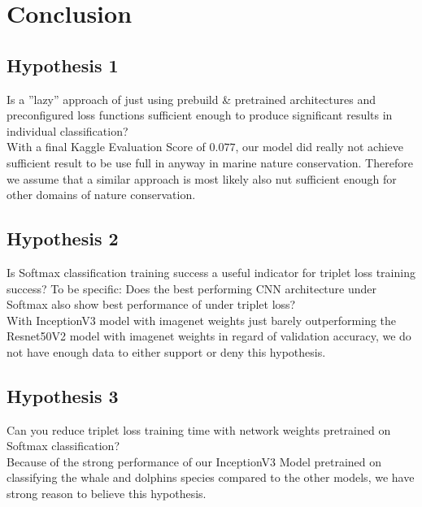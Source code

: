 \section{Conclusion}

\subsection{Hypothesis 1}
Is a ”lazy” approach of just using prebuild \& pretrained architectures and preconfigured loss functions sufficient enough to produce significant results in individual classification?
\\
With a final Kaggle Evaluation Score of $0.077$, our model did really not achieve sufficient result to be use full in anyway in marine nature conservation. Therefore we assume that a similar approach is most likely also nut sufficient enough for other domains of nature conservation.

\subsection{Hypothesis 2}
Is Softmax classification training success a useful indicator for triplet loss training success? To be specific: Does the best performing CNN architecture under Softmax also show best performance of under triplet loss?
\\
With InceptionV3 model with imagenet weights just barely outperforming the Resnet50V2 model with imagenet weights in regard of validation accuracy, we do not have enough data to either support or deny this hypothesis.

\subsection{Hypothesis 3}
Can you reduce triplet loss training time with network weights pretrained on Softmax classification?
\\
Because of the strong performance of our InceptionV3 Model pretrained on classifying the whale and dolphins species compared to the other models, we have strong reason to believe this hypothesis.

